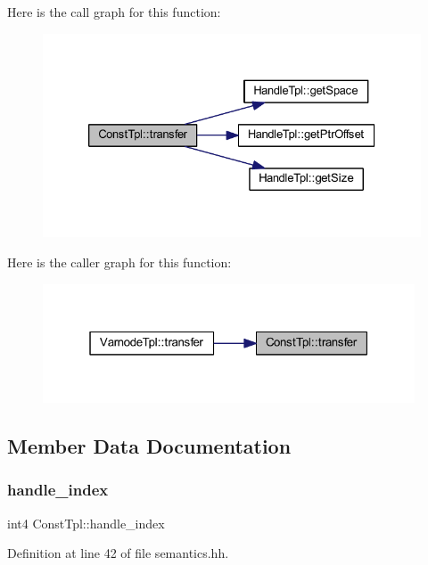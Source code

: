 Here is the call graph for this function\+:
\nopagebreak
\begin{figure}[H]
\begin{center}
\leavevmode
\includegraphics[width=326pt]{class_const_tpl_a71f5d8ca70523ece65f093a1d83ef314_cgraph}
\end{center}
\end{figure}
Here is the caller graph for this function\+:
\nopagebreak
\begin{figure}[H]
\begin{center}
\leavevmode
\includegraphics[width=313pt]{class_const_tpl_a71f5d8ca70523ece65f093a1d83ef314_icgraph}
\end{center}
\end{figure}


\subsection{Member Data Documentation}
\mbox{\label{class_const_tpl_add7fa48b1919c6d6d57ca9f111fbbdcd}} 
\subsubsection{\texorpdfstring{handle\_index}{handle\_index}}
{\footnotesize\ttfamily int4 Const\+Tpl\+::handle\+\_\+index}



Definition at line 42 of file semantics.\+hh.

